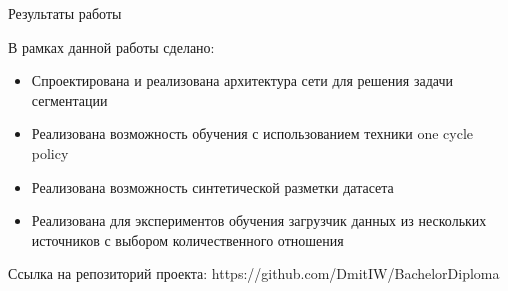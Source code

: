 
\begin{frame}{Результаты работы}
\begin{block}{}
    В рамках данной работы сделано:
\begin{itemize}
    \item Спроектирована и реализована архитектура сети для решения задачи сегментации
    \item Реализована возможность обучения с использованием техники one cycle policy
    \item Реализована возможность синтетической разметки датасета
    \item Реализована для экспериментов обучения загрузчик данных из нескольких источников с выбором количественного отношения
\end{itemize}
    Ссылка на репозиторий проекта: https://github.com/DmitIW/BachelorDiploma
\end{block}
\end{frame}